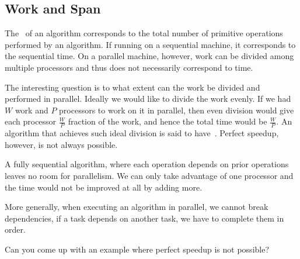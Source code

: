 \subsection{Work and Span}
\label{sec:introduction::parallelism::work-and-span}

\begin{cluster}
\label{grp:grm:introduction::parallelism::work}

\begin{gram}[Work]
\label{grm:introduction::parallelism::work}
The~ of an algorithm corresponds to the total number of
primitive operations performed by an algorithm.  If running on a
sequential machine, it corresponds to the sequential time.
On a parallel machine, however, work can be divided among multiple
processors and thus does not necessarily correspond to time.

The interesting question is to what extent can the work be divided and
performed in parallel.  Ideally we would like to divide the work
evenly.  If we had $W$ work and $P$ processors to work on it in
parallel, then even division would give each processor $\frac{W}{P}$
fraction of the work, and hence the total time would be $\frac{W}{P}$.
An algorithm that achieves such ideal division is said to
have~.  Perfect speedup, however, is not always
possible.

\end{gram}
\end{cluster}

\begin{cluster}
\label{grp:xmpl:introduction::parallelism::fully}

\begin{example}
\label{xmpl:introduction::parallelism::fully}
A fully sequential algorithm, where each operation depends on prior
operations leaves no room for parallelism.
We can only take advantage of one processor and the time would not be
improved at all by adding more.  

More generally, when executing an algorithm in parallel, we cannot
break dependencies, if a task depends on another task, we have to
complete them in order.

\end{example}
\end{cluster}

\begin{cluster}
\label{grp:tch:introduction::parallelism::come}

\begin{teachask}
\label{tch:introduction::parallelism::come}
Can you come up with an example where perfect speedup is not possible?

\end{teachask}
\end{cluster}

